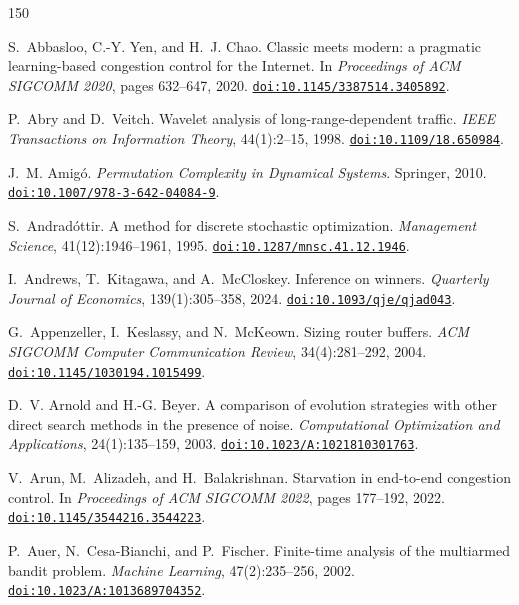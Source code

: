 \begin{thebibliography}{150}
\providecommand{\doi}[1]{\href{https://doi.org/#1}{\nolinkurl{doi:#1}}}
\setlength{\itemsep}{1pt}
\small

S.~Abbasloo, C.-Y. Yen, and H.~J. Chao. Classic meets modern: a pragmatic learning-based congestion control for the Internet. In \emph{Proceedings of ACM SIGCOMM 2020}, pages 632--647, 2020. \doi{10.1145/3387514.3405892}.

P.~Abry and D.~Veitch. Wavelet analysis of long-range-dependent traffic. \emph{IEEE Transactions on Information Theory}, 44(1):2--15, 1998. \doi{10.1109/18.650984}.

J.~M. Amig{\'o}. \emph{Permutation Complexity in Dynamical Systems}. Springer, 2010. \doi{10.1007/978-3-642-04084-9}.

S.~Andrad{\'o}ttir. A method for discrete stochastic optimization. \emph{Management Science}, 41(12):1946--1961, 1995. \doi{10.1287/mnsc.41.12.1946}.

I.~Andrews, T.~Kitagawa, and A.~McCloskey. Inference on winners. \emph{Quarterly Journal of Economics}, 139(1):305--358, 2024. \doi{10.1093/qje/qjad043}.

G.~Appenzeller, I.~Keslassy, and N.~McKeown. Sizing router buffers. \emph{ACM SIGCOMM Computer Communication Review}, 34(4):281--292, 2004. \doi{10.1145/1030194.1015499}.

D.~V. Arnold and H.-G. Beyer. A comparison of evolution strategies with other direct search methods in the presence of noise. \emph{Computational Optimization and Applications}, 24(1):135--159, 2003. \doi{10.1023/A:1021810301763}.

V.~Arun, M.~Alizadeh, and H.~Balakrishnan. Starvation in end-to-end congestion control. In \emph{Proceedings of ACM SIGCOMM 2022}, pages 177--192, 2022. \doi{10.1145/3544216.3544223}.

P.~Auer, N.~Cesa-Bianchi, and P.~Fischer. Finite-time analysis of the multiarmed bandit problem. \emph{Machine Learning}, 47(2):235--256, 2002. \doi{10.1023/A:1013689704352}.


\end{thebibliography}
